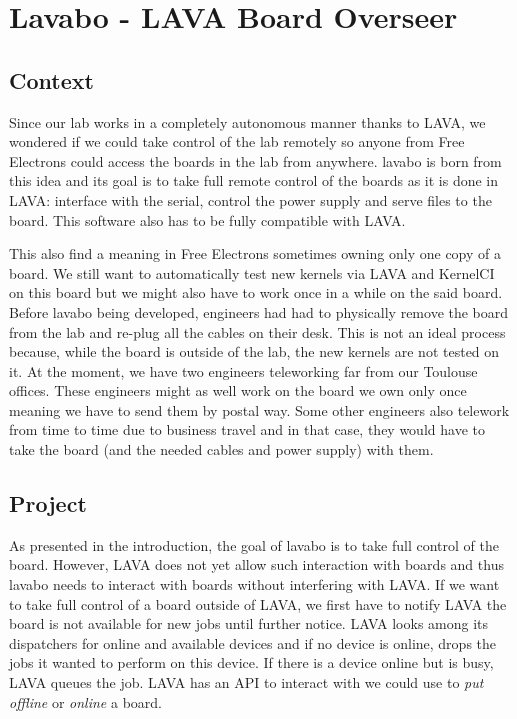 \chapter{Lavabo - LAVA Board Overseer}
\section{Context}

Since our lab works in a completely autonomous manner thanks to LAVA, we wondered if we could take control of the lab remotely so anyone from Free Electrons could access the boards in the lab from anywhere. lavabo is born from this idea and its goal is to take full remote control of the boards as it is done in LAVA: interface with the serial, control the power supply and serve files to the board. This software also has to be fully compatible with LAVA.

This also find a meaning in Free Electrons sometimes owning only one copy of a board. We still want to automatically test new kernels via LAVA and KernelCI on this board but we might also have to work once in a while on the said board. Before lavabo being developed, engineers had had to physically remove the board from the lab and re-plug all the cables on their desk. This is not an ideal process because, while the board is outside of the lab, the new kernels are not tested on it. At the moment, we have two engineers teleworking far from our Toulouse offices. These engineers might as well work on the board we own only once meaning we have to send them by postal way. Some other engineers also telework from time to time due to business travel and in that case, they would have to take the board (and the needed cables and power supply) with them.

\section{Project}

As presented in the introduction, the goal of lavabo is to take full control of the board. However, LAVA does not yet allow such interaction with boards and thus lavabo needs to interact with boards without interfering with LAVA. If we want to take full control of a board outside of LAVA, we first have to notify LAVA the board is not available for new jobs until further notice. LAVA looks among its dispatchers for online and available devices and if no device is online, drops the jobs it wanted to perform on this device. If there is a device online but is busy, LAVA queues the job. LAVA has an API to interact with  we could use to \textit{put offline} or \textit{online} a board.

